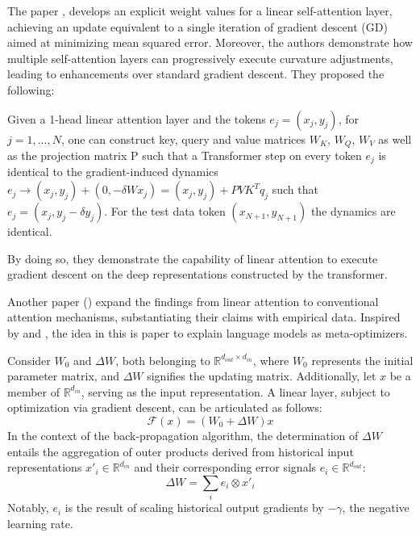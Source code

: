 \documentclass[11pt]{article}
\begin{document}
The paper \cite{pmlr-v202-von-oswald23a}, develops an explicit weight values for a linear self-attention layer, achieving an update equivalent to a single iteration of gradient descent (GD) aimed at minimizing mean squared error. Moreover, the authors demonstrate how multiple self-attention layers can progressively execute curvature adjustments, leading to enhancements over standard gradient descent.
They proposed the following:

Given a 1-head linear attention layer and
the tokens $e_{j} = (x_{j},y_{j})$, for $j = 1, . . . , N$, one can construct key, query and value matrices $W_{K}$, $W_{Q}$, $W_{V}$ as well
as the projection matrix P such that a Transformer step on
every token $e_j$ is identical to the gradient-induced dynamics $e_j \rightarrow (x_j , y_j ) + (0, - \delta W x_j ) = (x_j , y_j ) + PVK^{T}q_j$
such that $e_j = (x_j , y_j - \delta y_j )$. For the test data token
$(x_{N+1}, y_{N+1})$ the dynamics are identical.

By doing so, they demonstrate the capability of linear attention to execute gradient descent on the deep representations constructed by the transformer.


Another paper (\cite{2022arXiv221210559D}) expand the findings from linear attention to conventional attention mechanisms, substantiating their claims with empirical data.
Inspired by \cite{Aizerman2019TheoreticalFO} and \cite{unknown}, the idea in this is paper to explain language models as meta-optimizers.

Consider $W_0$ and $\Delta W$, both belonging to $\mathbb{R}^{d_{out} \times d_{in}}$, where $W_0$ represents the initial parameter matrix, and $\Delta W$ signifies the updating matrix. Additionally, let $x$ be a member of $\mathbb{R}^{d_{in}}$, serving as the input representation. A linear layer, subject to optimization via gradient descent, can be articulated as follows:
\begin{equation}
	\mathcal{F}(x) = (W_0 + \Delta W)x \label{eq:2}
\end{equation}
In the context of the back-propagation algorithm, the determination of $\Delta W$ entails the aggregation of outer products derived from historical input representations $x'_i \in \mathbb{R}^{d_{in}}$ and their corresponding error signals $e_i \in \mathbb{R}^{d_{out}}$:
\begin{equation}
	\Delta W = \sum_{i} e_i \otimes x'_i \label{eq:3}
\end{equation}
Notably, $e_i$ is the result of scaling historical output gradients by $-\gamma$, the negative learning rate.
\end{document}
